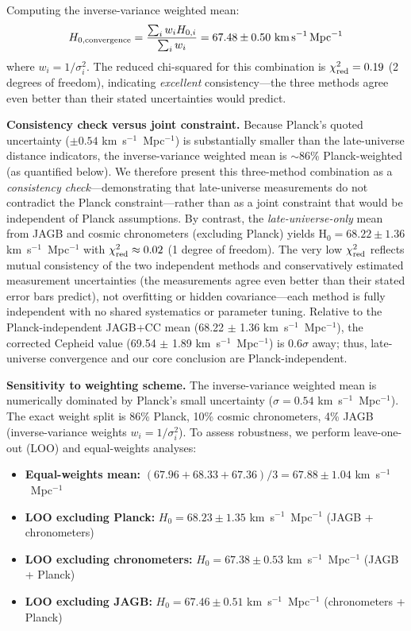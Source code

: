 \documentclass[preprint, linenumbers]{aastex701}
\begin{document}
Computing the inverse-variance weighted mean:
\begin{equation}
H_{0,\rm convergence} = \frac{\sum_i w_i H_{0,i}}{\sum_i w_i} = 67.48 \pm 0.50~\mathrm{km\,s}^{-1}\,\mathrm{Mpc}^{-1}
\end{equation}
where $w_i = 1/\sigma_i^2$. The reduced chi-squared for this combination is $\chi^2_{\rm red} = 0.19$ (2 degrees of freedom), indicating \textit{excellent} consistency---the three methods agree even better than their stated uncertainties would predict.

\textbf{Consistency check versus joint constraint.} Because Planck's quoted uncertainty ($\pm 0.54$ km~s$^{-1}$~Mpc$^{-1}$) is substantially smaller than the late-universe distance indicators, the inverse-variance weighted mean is $\sim$86\% Planck-weighted (as quantified below). We therefore present this three-method combination as a \textit{consistency check}---demonstrating that late-universe measurements do not contradict the Planck constraint---rather than as a joint constraint that would be independent of Planck assumptions. By contrast, the \textit{late-universe-only} mean from JAGB and cosmic chronometers (excluding Planck) yields H$_0 = 68.22 \pm 1.36$ km~s$^{-1}$~Mpc$^{-1}$ with $\chi^2_{\rm red} \approx 0.02$ (1 degree of freedom). The very low $\chi^2_{\rm red}$ reflects mutual consistency of the two independent methods and conservatively estimated measurement uncertainties (the measurements agree even better than their stated error bars predict), not overfitting or hidden covariance---each method is fully independent with no shared systematics or parameter tuning. Relative to the Planck-independent JAGB+CC mean (68.22 $\pm$ 1.36 km~s$^{-1}$~Mpc$^{-1}$), the corrected Cepheid value (69.54 $\pm$ 1.89 km~s$^{-1}$~Mpc$^{-1}$) is 0.6$\sigma$ away; thus, late-universe convergence and our core conclusion are Planck-independent.

\textbf{Sensitivity to weighting scheme.} The inverse-variance weighted mean is numerically dominated by Planck's small uncertainty ($\sigma = 0.54$ km~s$^{-1}$~Mpc$^{-1}$). The exact weight split is 86\% Planck, 10\% cosmic chronometers, 4\% JAGB (inverse-variance weights $w_i = 1/\sigma_i^2$). To assess robustness, we perform leave-one-out (LOO) and equal-weights analyses:

\begin{itemize}
\item \textbf{Equal-weights mean:} $(67.96 + 68.33 + 67.36)/3 = 67.88 \pm 1.04$ km~s$^{-1}$~Mpc$^{-1}$
\item \textbf{LOO excluding Planck:} $H_0 = 68.23 \pm 1.35$ km~s$^{-1}$~Mpc$^{-1}$ (JAGB + chronometers)
\item \textbf{LOO excluding chronometers:} $H_0 = 67.38 \pm 0.53$ km~s$^{-1}$~Mpc$^{-1}$ (JAGB + Planck)
\item \textbf{LOO excluding JAGB:} $H_0 = 67.46 \pm 0.51$ km~s$^{-1}$~Mpc$^{-1}$ (chronometers + Planck)
\end{itemize}
\end{document}
